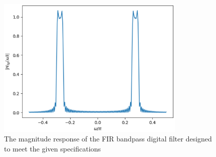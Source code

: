 \documentclass[journal,12pt,twocolumn]{IEEEtran}
\begin{document}
\begin{figure}
    \centering
    \includegraphics[width = 9cm]{./figs/fir/ee18btech11017_fir_bp.eps}
    \caption{The magnitude response of the FIR bandpass digital filter designed to meet the given specifications}
    \label{fig:fir_bandpass}
\end{figure}
\end{document}
